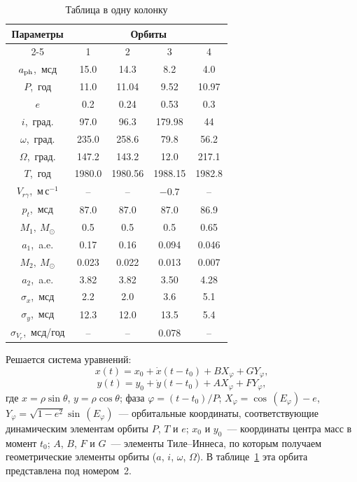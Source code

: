 \documentclass[
 aps, pra,
 amsmath,amssymb,
 11pt,
 final,
tightenlines,
 twoside,
 twocolumn,
 nofloats,
nofootinbib,
 superscriptaddress,
showkeys,
showkeywords,
 ]
{revtex4-2}
\begin{document}
\begin{table}
\caption {Таблица в одну колонку} \label{orbF}
\medskip
\begin{tabular}{c|c|c|c|c}
\hline
\multirow{2}{*}{Параметры} & \multicolumn{4}{c}{Орбиты}  \\
\cline{2-5}
 & 1 & 2 & 3 & 4 \\
\hline
$a_{\rm ph}$,~мсд          & 15.0    & 14.3    & 8.2     & 4.0 \\
$P$,~год                   & 11.0    & 11.04   & 9.52    & 10.97 \\
$e$                        & 0.2     & 0.24    & 0.53    & 0.3 \\
$i$,~град.                 & 97.0    & 96.3    & 179.98  & 44 \\
$\omega$,~град.            & 235.0   & 258.6   & 79.8    & 56.2 \\
$\Omega$,~град.            & 147.2   & 143.2   & 12.0    & 217.1 \\
$T$,~год                   & 1980.0  & 1980.56 & 1988.15 & 1982.8 \\
$V_{r\gamma}$,~м\,с$^{-1}$ & --      & --      & $-0.7$  & -- \\
\hline
$p_t$,~мсд                 & 87.0    & 87.0    & 87.0    & 86.9\\
$M_1,~M_\odot$             & 0.5     & 0.5     & 0.5     & 0.65 \\
$a_1$,~a.e.                & 0.17    & 0.16    & 0.094   & 0.046 \\
$M_2,~M_\odot$             & 0.023   & 0.022   & 0.013   & 0.007 \\
$a_2$,~a.e.                & 3.82    & 3.82    & 3.50    & 4.28 \\
\hline
$\sigma_x$,~мсд            & 2.2     & 2.0     & 3.6     & 5.1 \\
$\sigma_y$,~мсд            & 12.3    & 12.0    & 13.5    & 5.4 \\
$\sigma_{V_r}$,~мсд/год    & --      & --      & 0.078   & -- \\
\hline
\end{tabular}
\end{table}

Решается система уравнений:
\begin{equation}
\label{four} x(t)=x_0+\dot{x}(t-t_0)+BX_{\varphi}+GY_{\varphi},
\end{equation}
\begin{equation}
\label{five} y(t)=y_0+\dot{y}(t-t_0)+AX_{\varphi}+FY_{\varphi},
\end{equation}
где $x=\rho\sin\theta$, $y=\rho\cos\theta$; фаза
$\varphi=(t-t_0)/P$; $X_{\varphi}=\cos\,(E_{\varphi})-e$,
$Y_{\varphi}=\sqrt{1-e^2}\sin\,(E_{\varphi})$~--- орбитальные
координаты, соответствующие динамическим элементам орбиты $P$, $T$
и $e$; $x_0$ и $y_0$~--- координаты центра масс в момент $t_0$;
$A$, $B$, $F$ и $G$~--- элементы Тиле--Иннеса, по которым получаем
геометрические элементы орбиты ($a$, $i$, $\omega$, $\Omega$). В
таблице~\ref{orbF} эта орбита представлена под номером~2.
\end{document}
